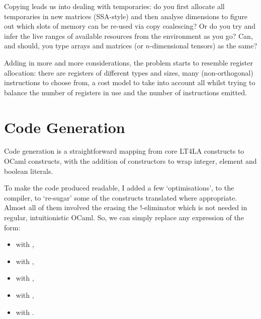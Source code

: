 Copying leads us into dealing with temporaries: do you first allocate all
temporaries in new matrices (SSA-style) and then analyse dimensions to figure
out which slots of memory can be re-used via copy coalescing? Or do you try and
infer the live ranges of available resources from the environment as you go?
Can, and should, you type arrays and matrices (or $n$-dimensional tensors) as
the same?

Adding in more and more considerations, the problem starts to resemble register
allocation: there are registers of different types and sizes, many
(non-orthogonal) instructions to choose from, a cost model to take into account
all whilst trying to balance the number of registers in use and the number of
instructions emitted.

\section{Code Generation}

Code generation is a straightforward mapping from core LT4LA constructs to
OCaml constructs, with the addition of  constructors to wrap
integer, element and boolean literals.

To make the code produced readable, I added a few `optimisations', to the
compiler, to `re-sugar' some of the constructs translated where appropriate.
Almost all of them involved the erasing the \mbox{!-eliminator} which is not needed in
regular, intuitionistic OCaml. So, we can simply replace any expression of
the form:

\begin{itemize}

    \item {} with
        , 

    \item {} with
        ,

    \item {} with
        ,

    \item {} with ,

    \item {} with
        .

\end{itemize}

